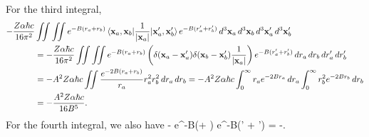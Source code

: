 \begin{solution}
	For the third integral,
	\begin{align*}
		-\frac{Z \alpha \hbar c}{16\pi^2} &\iint \iint e^{-B(r_a + r_b)} \mel{\vb{x}_a, \vb{x}_b}{\frac{1}{\abs{\vb{x}_a}}}{\vb{x}_a', \vb{x}_b'} e^{-B(r_a' + r_b')} \dd[3]{\vb{x}_a} \dd[3]{\vb{x}_b} \dd[3]{\vb{x}_a'} \dd[3]{\vb{x}_b'} \\
		&= -\frac{Z \alpha \hbar c}{16\pi^2}\iint \iint e^{-B(r_a + r_b)} \left( \delta(\vb{x}_a - \vb{x}_a') \delta(\vb{x}_b - \vb{x}_b') \frac{1}{\abs{\vb{x}_a}} \right) e^{-B(r_a' + r_b')} \dd{r_a} \dd{r_b} \dd{r_a'} \dd{r_b'} \\
		&= -A^2 Z \alpha \hbar c \iint \frac{e^{-2B(r_a + r_b)}}{r_a} r_a^2 r_b^2 \dd{r_a} \dd{r_b}
		= -A^2 Z \alpha \hbar c \int_0^\infty r_a e^{-2 B r_a} \dd{r_a} \int_0^\infty r_b^2 e^{-2 B r_b} \dd{r_b} \\
		&= -\frac{A^2 Z \alpha \hbar c}{16 B^5}.
	\end{align*}
	For the fourth integral, we also have
	\beq
		- \iint \iint e^{-B(\ra + \rb)}  e^{-B(\ra' + \rb')} \dcxa \dcxb \dcxap \dcxbp = -.
	\eeq
	

\end{solution}
